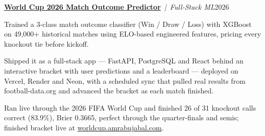 \documentclass[10pt,letterpaper]{article}
\newcommand{\cvproject}[3]{%
  \vspace{4.5pt}%
  \textbf{#1}~\textit{|~#2}\hfill #3\par\vspace{1pt}%
}
\newenvironment{cvbullets}{%
  \begin{list}{\textbullet}{%
    \setlength{\leftmargin}{1.6em}%
    \setlength{\rightmargin}{0pt}%
    \setlength{\labelwidth}{1.1em}%
    \setlength{\labelsep}{0.5em}%
    \setlength{\itemindent}{0pt}%
    \setlength{\listparindent}{0pt}%
    \setlength{\topsep}{1pt}%
    \setlength{\partopsep}{0pt}%
    \setlength{\parsep}{0pt}%
    \setlength{\itemsep}{1.5pt}%
  }%
}{\end{list}}
\begin{document}
\cvproject{\href{https://github.com/AmroAbujabal/world-cup-2026-predictor}{World Cup 2026 Match Outcome Predictor}}{Full-Stack ML}{2026}
\begin{cvbullets}
  \item Trained a 3-class match outcome classifier (Win / Draw / Loss) with XGBoost on 49,000+ historical
        matches using ELO-based engineered features, pricing every knockout tie before kickoff.
  \item Shipped it as a full-stack app --- FastAPI, PostgreSQL and React behind an interactive bracket with
        user predictions and a leaderboard --- deployed on Vercel, Render and Neon, with a scheduled sync
        that pulled real results from football-data.org and advanced the bracket as each match finished.
  \item Ran live through the 2026 FIFA World Cup and finished 26 of 31 knockout calls correct (83.9\%),
        Brier 0.3665, perfect through the quarter-finals and semis; finished bracket live at
        \href{https://worldcup.amrabujabal.com}{worldcup.amrabujabal.com}.
\end{cvbullets}
\end{document}
